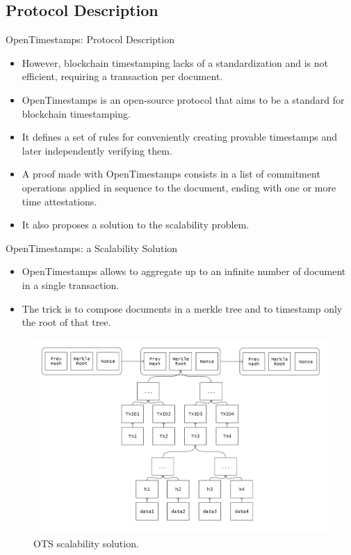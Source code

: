 \documentclass[usenames,dvipsnames]{beamer}
\begin{document}
    \subsection{Protocol Description}
    \begin{frame}{OpenTimestamps: Protocol Description}
        \begin{itemize}
            \item However, \alert{blockchain timestamping} lacks of a standardization and is \alert{not efficient}, requiring a transaction per document.
            \item \alert{OpenTimestamps} is an open-source protocol that aims to be a \alert{standard} for blockchain timestamping.
            \item It defines a set of rules for \alert{conveniently} creating \alert{provable timestamps} and later \alert{independently verifying} them.
            \item A \alert{proof} made with OpenTimestamps consists in a list of \alert{commitment operations} applied in sequence to the document, ending with one or more \alert{time attestations}.
            \item It also proposes a \alert{solution} to the \alert{scalability problem}.
        \end{itemize}
    \end{frame}
    
    \begin{frame}{OpenTimestamps: a Scalability Solution}
        \begin{itemize}
            \item OpenTimestamps allows to \alert{aggregate} up to an \alert{infinite number} of document in a single transaction.
            \item The trick is to compose documents in a \alert{merkle tree} and to timestamp only the \alert{root} of that tree.
        \end{itemize}
        \begin{figure}
        \centering
        \includegraphics[width=0.6\linewidth]{Images/bitcoin-chain-calendar.png}
        \caption{OTS scalability solution.}
        \end{figure}
    \end{frame}
    
\end{document}
